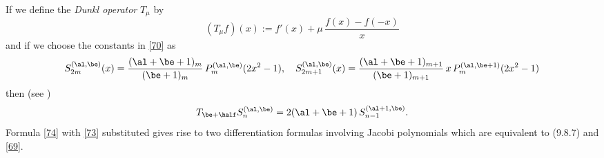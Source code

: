 \documentclass[envcountchap,graybox]{svmono}
\begin{document}
If we define the {\em Dunkl operator} $T_\mu$ by
\begin{equation}
(T_\mu f)(x):=f'(x)+\mu\,\frac{f(x)-f(-x)}x
\label{72}
\end{equation}
and if we choose the constants in \eqref{70} as
\begin{equation}
S_{2m}^{(\al,\be)}(x)=\frac{(\al+\be+1)_m}{(\be+1)_m}\, P_m^{(\al,\be)}(2x^2-1),\quad
S_{2m+1}^{(\al,\be)}(x)=\frac{(\al+\be+1)_{m+1}}{(\be+1)_{m+1}}\,
x\,P_m^{(\al,\be+1)}(2x^2-1)
\label{73}
\end{equation}
then (see \cite[(1.6)]{K5})
\begin{equation}
T_{\be+\half}S_n^{(\al,\be)}=2(\al+\be+1)\,S_{n-1}^{(\al+1,\be)}.
\label{74}
\end{equation}
Formula \eqref{74} with \eqref{73} substituted gives rise to two
differentiation formulas involving Jacobi polynomials which are equivalent to
(9.8.7) and \eqref{69}.
\end{document}
